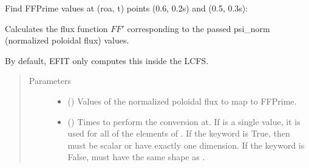 \documentclass[letterpaper,10pt,english]{sphinxmanual}
\begin{document}
\begin{fulllineitems}
\begin{fulllineitems}
Find FFPrime values at (roa, t) points (0.6, 0.2s) and (0.5, 0.3s):

\begin{sphinxVerbatim}[commandchars=\\\{\}]
  \PYG{p}{[} \PYG{p}{]} \PYG{p}{[} \PYG{p}{]} 
\end{sphinxVerbatim}

\end{fulllineitems}


\begin{fulllineitems}
\label{\detokenize{eqtools:eqtools.core.Equilibrium.psinorm2FFPrime}}
Calculates the flux function \(FF'\) corresponding to the passed psi\_norm (normalized poloidal flux) values.

By default, EFIT only computes this inside the LCFS.
\begin{quote}\begin{description}
\item[{Parameters}] \leavevmode\begin{itemize}
\item {} 
 () \textendash{} Values of the normalized
poloidal flux to map to FFPrime.

\item {} 
 () \textendash{} Times to perform the conversion at.
If  is a single value, it is used for all of the elements of
. If the  keyword is True, then  must be scalar
or have exactly one dimension. If the  keyword is False,
 must have the same shape as .


\end{itemize}
\end{description}
\end{quote}
\end{fulllineitems}
\end{fulllineitems}
\end{document}
